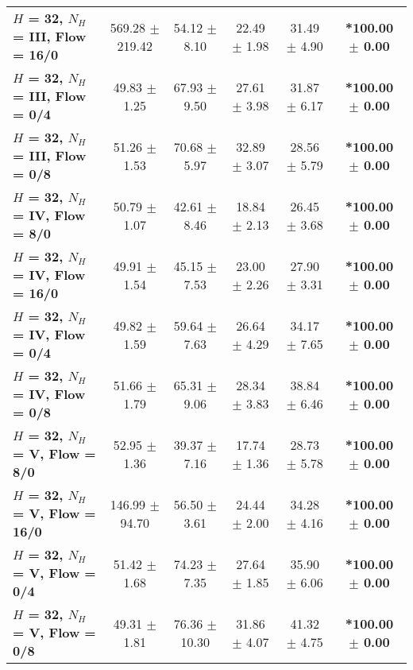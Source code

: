 \begin{table*}[ht]
{\begin{tabular}{lccccc}
        \textbf{$H$ = 32, $N_H$ = III, Flow = 16/0} & 569.28 $\pm$ 219.42 & 54.12 $\pm$ 8.10 & 22.49 $\pm$ 1.98 & 31.49 $\pm$ 4.90 & \textbf{*100.00 $\pm$ 0.00} \\
        \textbf{$H$ = 32, $N_H$ = III, Flow = 0/4} & 49.83 $\pm$ 1.25 & 67.93 $\pm$ 9.50 & 27.61 $\pm$ 3.98 & 31.87 $\pm$ 6.17 & \textbf{*100.00 $\pm$ 0.00} \\
        \textbf{$H$ = 32, $N_H$ = III, Flow = 0/8} & 51.26 $\pm$ 1.53 & 70.68 $\pm$ 5.97 & 32.89 $\pm$ 3.07 & 28.56 $\pm$ 5.79 & \textbf{*100.00 $\pm$ 0.00} \\
        \midrule
        \textbf{$H$ = 32, $N_H$ = IV, Flow = 8/0} & 50.79 $\pm$ 1.07 & 42.61 $\pm$ 8.46 & 18.84 $\pm$ 2.13 & 26.45 $\pm$ 3.68 & \textbf{*100.00 $\pm$ 0.00} \\
        \textbf{$H$ = 32, $N_H$ = IV, Flow = 16/0} & 49.91 $\pm$ 1.54 & 45.15 $\pm$ 7.53 & 23.00 $\pm$ 2.26 & 27.90 $\pm$ 3.31 & \textbf{*100.00 $\pm$ 0.00} \\
        \textbf{$H$ = 32, $N_H$ = IV, Flow = 0/4} & 49.82 $\pm$ 1.59 & 59.64 $\pm$ 7.63 & 26.64 $\pm$ 4.29 & 34.17 $\pm$ 7.65 & \textbf{*100.00 $\pm$ 0.00} \\
        \textbf{$H$ = 32, $N_H$ = IV, Flow = 0/8} & 51.66 $\pm$ 1.79 & 65.31 $\pm$ 9.06 & 28.34 $\pm$ 3.83 & 38.84 $\pm$ 6.46 & \textbf{*100.00 $\pm$ 0.00} \\
        \midrule
        \textbf{$H$ = 32, $N_H$ = V, Flow = 8/0} & 52.95 $\pm$ 1.36 & 39.37 $\pm$ 7.16 & 17.74 $\pm$ 1.36 & 28.73 $\pm$ 5.78 & \textbf{*100.00 $\pm$ 0.00} \\
        \textbf{$H$ = 32, $N_H$ = V, Flow = 16/0} & 146.99 $\pm$ 94.70 & 56.50 $\pm$ 3.61 & 24.44 $\pm$ 2.00 & 34.28 $\pm$ 4.16 & \textbf{*100.00 $\pm$ 0.00} \\
        \textbf{$H$ = 32, $N_H$ = V, Flow = 0/4} & 51.42 $\pm$ 1.68 & 74.23 $\pm$ 7.35 & 27.64 $\pm$ 1.85 & 35.90 $\pm$ 6.06 & \textbf{*100.00 $\pm$ 0.00} \\
        \textbf{$H$ = 32, $N_H$ = V, Flow = 0/8} & 49.31 $\pm$ 1.81 & 76.36 $\pm$ 10.30 & 31.86 $\pm$ 4.07 & 41.32 $\pm$ 4.75 & \textbf{*100.00 $\pm$ 0.00} \\
        \bottomrule
    \end{tabular}
    }
\end{table*}



